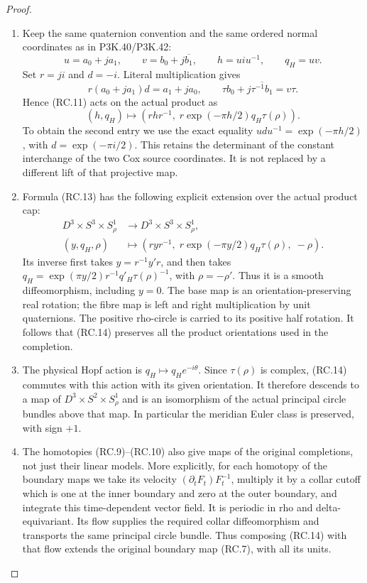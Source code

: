 \begin{proof}
\begin{enumerate}[label=\arabic*.]
\item Keep the same quaternion convention and the same ordered normal
coordinates as in P3K.40/P3K.42:
\[
 u=a_0+ja_1,\qquad v=b_0+j\overline{b_1},\qquad
 h=uiu^{-1},\qquad q_H=uv.
\]
Set \(r=ji\) and \(d=-i\). Literal multiplication gives
\[
 r(a_0+ja_1)d=a_1+ja_0,
 \qquad
 \tau b_0+j\overline{\tau^{-1}b_1}=v\tau.
                                                               \tag{RC.12}
\]
Hence (RC.11) acts on the actual product as
\[
 (h,q_H)\longmapsto
 \left(rhr^{-1},\;r\exp(-\pi h/2)q_H\tau(\rho)\right).
                                                               \tag{RC.13}
\]
To obtain the second entry we use the exact equality
\(udu^{-1}=\exp(-\pi h/2)\), with \(d=\exp(-\pi i/2)\).
This retains the determinant of the constant interchange of the two
Cox source coordinates. It is not replaced by a different lift of
that projective map.

\item Formula (RC.13) has the following explicit extension over the
actual product cap:
\[
 \begin{aligned}
 D^3\times S^3\times S^1_\rho&\longrightarrow
                  D^3\times S^3\times S^1_\rho,\\
 (y,q_H,\rho)&\longmapsto
 \left(ryr^{-1},\;r\exp(-\pi y/2)q_H\tau(\rho),\;-\rho\right).
 \end{aligned}                                               \tag{RC.14}
\]
Its inverse first takes \(y=r^{-1}y'r\), and then takes
\(q_H=\exp(\pi y/2)r^{-1}q'_H\tau(\rho)^{-1}\), with
\(\rho=-\rho'\). Thus it is a smooth diffeomorphism, including
\(y=0\). The base map is an orientation-preserving real rotation;
the fibre map is left and right multiplication by unit quaternions.
The positive rho-circle is carried to its positive half rotation.
It follows that (RC.14) preserves all the product orientations used
in the completion.

\item The physical Hopf action is \(q_H\mapsto q_He^{-i\theta}\).
Since \(\tau(\rho)\) is complex, (RC.14) commutes with this action
with its given orientation. It therefore descends to a map of
\(D^3\times S^2\times S^1_\rho\) and is an isomorphism of the
actual principal circle bundles above that map. In particular the
meridian Euler class is preserved, with sign \(+1\).

\item The homotopies (RC.9)--(RC.10) also give maps of the original
completions, not just their linear models. More explicitly, for each
homotopy of the boundary maps we take its velocity
\((\partial_tF_t)F_t^{-1}\), multiply it by a collar cutoff which is
one at the inner boundary and zero at the outer boundary, and
integrate this time-dependent vector field. It is periodic in rho
and delta-equivariant. Its flow supplies the required collar
diffeomorphism and transports the same principal circle bundle.
Thus composing (RC.14) with that flow extends the original boundary
map (RC.7), with all its units.


\end{enumerate}
\end{proof}

